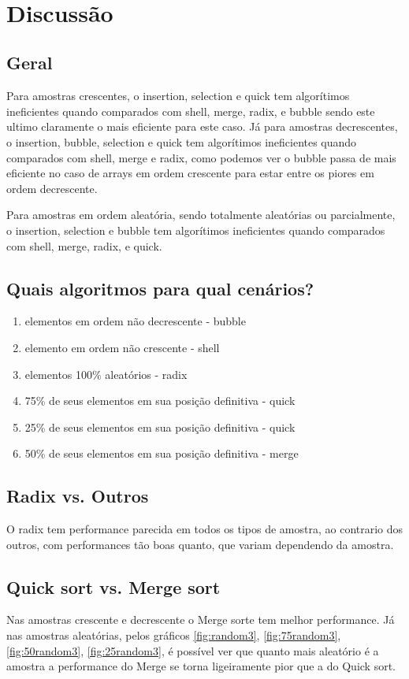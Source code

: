 \documentclass[a4paper, 12pt]{article}
\begin{document}
\newpage


$  $ \\
	\newpage
	\section{Discussão}
	\subsection{Geral} 
		Para amostras crescentes, o insertion, selection e quick tem algorítimos ineficientes quando comparados com shell, merge, radix, e bubble sendo este ultimo claramente o mais eficiente para este caso. Já para amostras decrescentes, o insertion, bubble, selection e quick tem algorítimos ineficientes quando comparados com shell, merge e radix, como podemos ver o bubble passa de mais eficiente no caso de arrays em ordem crescente para estar entre os piores em ordem decrescente.
		\indent
		
		Para amostras em ordem aleatória, sendo totalmente aleatórias ou parcialmente, o insertion, selection e bubble tem algorítimos ineficientes quando comparados com shell, merge, radix, e quick.
	\subsection{Quais algoritmos para qual cenários?}
	
	\begin{enumerate}
		\item  elementos em ordem não decrescente - bubble
		\item  elemento em ordem não crescente - shell
		\item  elementos 100\% aleatórios - radix
		\item  75\% de seus elementos em sua posição definitiva - quick
		\item  25\% de seus elementos em sua posição definitiva - quick
		\item  50\% de seus elementos em sua posição definitiva - merge
	\end{enumerate}


	\subsection{Radix vs. Outros}
	O radix tem performance parecida em todos os tipos de amostra, ao contrario dos outros, com performances tão boas quanto, que variam dependendo da amostra.
	\subsection{Quick sort vs. Merge sort}
		Nas amostras crescente e decrescente o Merge sorte tem melhor performance.
		Já nas amostras aleatórias, pelos gráficos \ref{fig:random3}, \ref{fig:75random3}, \ref{fig:50random3}, \ref{fig:25random3}, é possível ver que quanto mais aleatório é a amostra a performance do Merge se torna ligeiramente pior que a do Quick sort.
\end{document}
